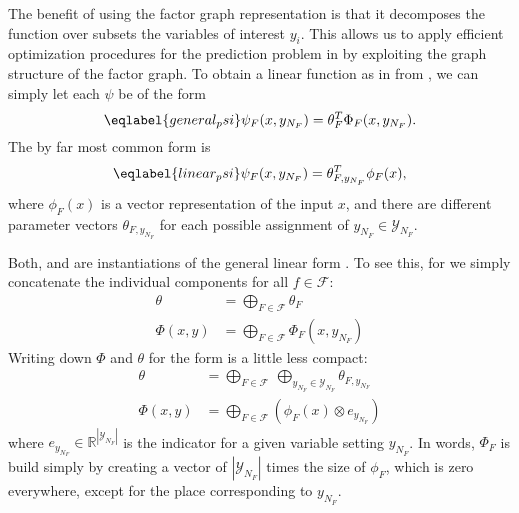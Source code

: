 The benefit of using the factor graph representation is that it decomposes the
function over subsets the variables of interest $y_i$. This allows us to apply
efficient optimization procedures for the prediction problem in
 by exploiting the graph structure of the factor graph.
%
To obtain a linear function as in  from
, we can simply let each $\psi$ be of the form
\begin{equation}\eqlabel{general_psi}
    \psi_F(x, y_{N_F}) = \theta_F^T \Phi_F(x, y_{N_F}).
\end{equation}
The by far most common form is 
\begin{equation}\eqlabel{linear_psi}
    \psi_F(x, y_{N_F}) = \theta_{F, y_{N_F}}^T \phi_F(x),
\end{equation}
where $\phi_F(x)$ is a vector representation of the input $x$, and there are
different parameter vectors $\theta_{F, y_{N_F}}$ for each possible assignment
of $y_{N_F} \in \mathcal{Y}_{N_F}$.

Both,  and  are instantiations of the general
linear form . To see this, for  we simply
concatenate the individual components for all $f \in \mathcal{F}$:
\begin{align}
    \theta &= \bigoplus_{F \in \mathcal{F}} \theta_F\\
    \Phi(x, y) &= \bigoplus_{F \in \mathcal{F}} \Phi_F(x, y_{N_F})
\end{align}
Writing down $\Phi$ and $\theta$ for the form  is a little less compact:
\begin{align}
    \theta &= \bigoplus_{F \in \mathcal{F}}\ \bigoplus_{y_{N_F} \in \mathcal{Y}_{N_F}} \theta_{F, y_{N_F}}\\
    \Phi(x, y) &= \bigoplus_{F \in \mathcal{F}} \left (\phi_F(x) \otimes e_{y_{N_F}} \right )
\end{align}
where $e_{y_{N_F}} \in \mathbb{R}^{|\mathcal{Y}_{N_F}|}$ is the indicator for a
given variable setting $y_{N_F}$.
In words, $\Phi_F$ is build simply by creating a vector of
$|\mathcal{Y}_{N_F}|$ times the size of $\phi_F$, which is zero everywhere,
except for the place corresponding to $y_{N_F}$. %

